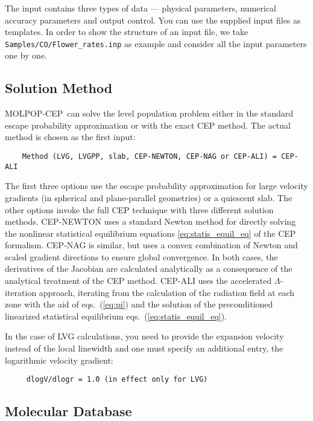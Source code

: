 \documentclass[12pt]{article}
\def\separation {0.5cm}
\def\M{MOLPOP-CEP}
\begin{document}
The input contains three types of data --- physical parameters, numerical
accuracy parameters and output control.  You can use the supplied input files
as templates. In order to show the structure of an input file, we take
\texttt{Samples/CO/Flower\_rates.inp} as example and consider all the input
parameters one by one.

\subsection{Solution Method}

\M\ can solve the level population problem either in the standard escape
probability approximation or with the exact CEP method. The actual method is
chosen as the first input:

\vspace{\separation}
\begin{verbatim}
    Method (LVG, LVGPP, slab, CEP-NEWTON, CEP-NAG or CEP-ALI) = CEP-ALI
\end{verbatim}
The first three options use the escape probability approximation for large
velocity gradients (in spherical and plane-parallel geometries) or a quiescent slab. The other options invoke the full CEP
technique with three different solution methods. CEP-NEWTON uses a standard
Newton method for directly solving the nonlinear statistical equilibrium
equations \ref{eq:statis_equil_eq} of the CEP formalism. CEP-NAG is similar,
but uses a convex combination of Newton and scaled gradient directions to
ensure global convergence. In both cases, the derivatives of the Jacobian are
calculated analytically as a consequence of the analytical treatment of the CEP
method. CEP-ALI uses the accelerated $\Lambda$-iteration approach, iterating
from the calculation of the radiation field at each zone with the aid of eqs.\
(\ref{eq:pi}) and the solution of the preconditioned linearized statistical
equilibrium eqs.\ (\ref{eq:statis_equil_eq}).

In the case of LVG calculations, you need to provide the expansion velocity
instead of the local linewidth and one must specify an additional entry, the
logarithmic velocity gradient:
%
\smallskip
\begin{verbatim}
     dlogV/dlogr = 1.0 (in effect only for LVG)
\end{verbatim}


\subsection{Molecular Database}
\end{document}
